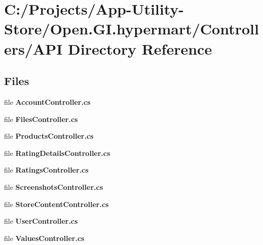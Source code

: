 \section{C\+:/\+Projects/\+App-\/\+Utility-\/\+Store/\+Open.G\+I.\+hypermart/\+Controllers/\+A\+PI Directory Reference}
\label{dir_67f23900e296d67db2601f3686e70102}
\subsection*{Files}
\begin{DoxyCompactItemize}
\item 
file \textbf{ Account\+Controller.\+cs}
\item 
file \textbf{ Files\+Controller.\+cs}
\item 
file \textbf{ Products\+Controller.\+cs}
\item 
file \textbf{ Rating\+Details\+Controller.\+cs}
\item 
file \textbf{ Ratings\+Controller.\+cs}
\item 
file \textbf{ Screenshots\+Controller.\+cs}
\item 
file \textbf{ Store\+Content\+Controller.\+cs}
\item 
file \textbf{ User\+Controller.\+cs}
\item 
file \textbf{ Values\+Controller.\+cs}
\end{DoxyCompactItemize}
